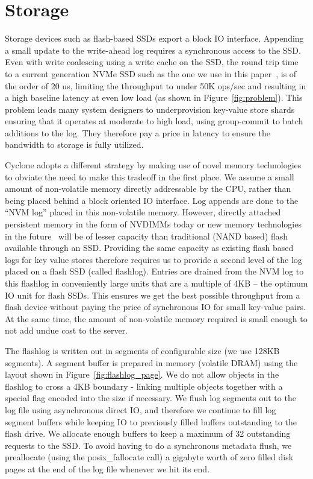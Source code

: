 \documentclass[pageno]{jpaper}
\begin{document}
\section{Storage}
\label{sec:storage}
Storage devices such as flash-based SSDs export a block IO interface. Appending
a small update to the write-ahead log requires a synchronous access to the
SSD. Even with write coalescing using a write cache on the SSD, the round trip
time to a current generation NVMe SSD such as the one we use in this
paper~\cite{ssd_spec}, is of the order of 20 us, limiting the throughput to
under 50K ops/sec and resulting in a high baseline latency at even low load (as
shown in Figure~\ref{fig:problem}). This problem leads many system designers to
underprovision key-value store shards ensuring that it operates at moderate to
high load, using group-commit to batch additions to the log. They therefore pay
a price in latency to ensure the bandwidth to storage is fully utilized.

Cyclone adopts a different strategy by making use of novel memory technologies
to obviate the need to make this tradeoff in the first place. We assume a small
amount of non-volatile memory directly addressable by the CPU, rather than being
placed behind a block oriented IO interface. Log appends are done to the ``NVM
log'' placed in this non-volatile memory. However, directly attached persistent 
memory in the form of NVDIMMs today or new memory technologies in the
future~\cite{pmfs} will be of lesser capacity than traditional (NAND based)
flash available through an
SSD. Providing the same capacity as existing flash based logs for key value
stores therefore requires us to provide a second level of the log
placed on a flash SSD (called flashlog).  Entries are drained from
the NVM log to this flashlog in conveniently large units that are a multiple of
4KB -- the optimum IO unit for flash SSDs. This ensures we get the best possible
throughput from a flash device without paying the price of synchronous IO for
small key-value pairs. At the same time, the amount of non-volatile memory
required is small enough to not add undue cost to the server.

The flashlog is written out in segments of configurable size (we use 128KB
segments). A segment buffer is prepared in memory (volatile DRAM) using the
layout shown in Figure~\ref{fig:flashlog_page}. We do not allow objects in the
flashlog to cross a 4KB boundary - linking multiple objects together with a
special flag encoded into the size if necessary. We flush log segments out to
the log file using asynchronous direct IO, and therefore we continue to fill log
segment buffers while keeping IO to previously filled buffers outstanding to the
flash drive. We allocate enough buffers to keep a maximum of 32 outstanding
requests to the SSD. To avoid having to do a synchronous metadata flush, we
preallocate (using the posix\_fallocate call) a gigabyte worth of zero filled
disk pages at the end of the log file whenever we hit its end.
\end{document}
